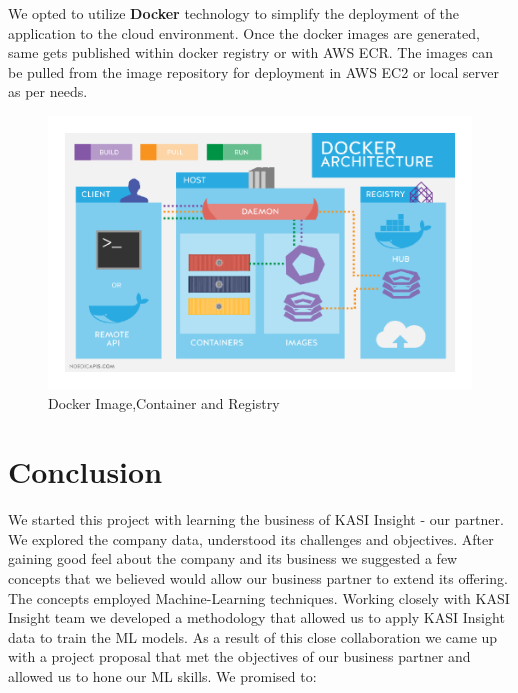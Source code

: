 We opted to utilize \textbf{Docker} technology to simplify the
deployment of the application to the cloud environment. Once the docker
images are generated, same gets published within docker registry or with
AWS ECR. The images can be pulled from the image repository for
deployment in AWS EC2 or local server as per needs.

\begin{Schunk}
\begin{figure}[H]

{\centering \includegraphics[width=1.15\linewidth]{../../artifacts/docker} 

}

\caption[Docker Image,Container and Registry]{Docker Image,Container and Registry}\label{fig:di}
\end{figure}
\end{Schunk}

\hypertarget{conclusion}{%
\section{Conclusion}\label{conclusion}}

We started this project with learning the business of KASI Insight - our
partner. We explored the company data, understood its challenges and
objectives. After gaining good feel about the company and its business
we suggested a few concepts that we believed would allow our business
partner to extend its offering. The concepts employed Machine-Learning
techniques. Working closely with KASI Insight team we developed a
methodology that allowed us to apply KASI Insight data to train the ML
models. As a result of this close collaboration we came up with a
project proposal that met the objectives of our business partner and
allowed us to hone our ML skills. We promised to:

